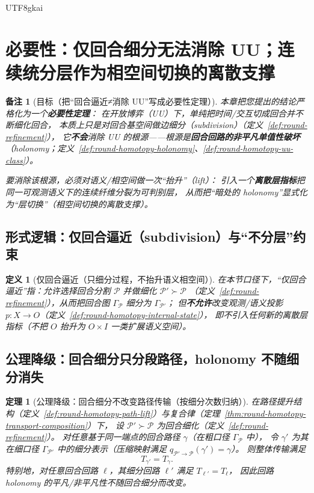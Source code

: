 \documentclass[12pt]{article}
\newtheorem{definition}{定义}[section]
\newtheorem{theorem}{定理}[section]
\newtheorem{remark}{备注}[section]
\begin{document}
\begin{CJK*}{UTF8}{gkai}
\section{必要性：仅回合细分无法消除 UU；连续统分层作为相空间切换的离散支撑}
\label{sec:uu-holonomy-layering-necessity}

\begin{remark}[目标（把“回合逼近≠消除 UU”写成必要性定理）]
本章把您提出的结论严格化为一个\textbf{必要性定理}：
在开放博弈（UU）下，单纯把时间/交互切成回合并不断细化回合，
本质上只是对回合基空间做边细分（subdivision）（定义~\ref{def:round-refinement}），
它\textbf{不会}消除 UU 的根源——根源是\textbf{回合回路的非平凡单值性破坏}（holonomy；定义~\ref{def:round-homotopy-holonomy}、\ref{def:round-homotopy-uu-class}）。

要消除该根源，必须对语义/相空间做一次“抬升”（lift）：
引入一个\textbf{离散层指标}把同一可观测语义下的连续纤维分裂为可判别层，
从而把“暗处的 holonomy”显式化为“层切换”（相空间切换的离散支撑）。
\end{remark}

\subsection{形式逻辑：仅回合逼近（subdivision）与“不分层”约束}
\label{sec:only-round-subdivision-no-layering}

\begin{definition}[仅回合逼近（只细分过程，不抬升语义相空间）]
\label{def:only-round-approximation}
在本节口径下，“仅回合逼近”指：允许选择回合分割 $\mathcal{P}$ 并做细化 $\mathcal{P}'\succ\mathcal{P}$
（定义~\ref{def:round-refinement}），从而把回合图 $\Gamma_{\mathcal{P}}$ 细分为 $\Gamma_{\mathcal{P}'}$；
但\textbf{不允许}改变观测/语义投影 $p:X\to O$（定义~\ref{def:round-homotopy-internal-state}），
即不引入任何新的离散层指标（不把 $O$ 抬升为 $O\times I$ 一类扩展语义空间）。
\end{definition}

\subsection{公理降级：回合细分只分段路径，holonomy 不随细分消失}
\label{sec:subdivision-preserve-holonomy}

\begin{theorem}[公理降级：回合细分不改变路径传输（按细分次数归纳）]
\label{thm:subdivision-preserve-transport}
在路径提升结构（定义~\ref{def:round-homotopy-path-lift}）与复合律（定理~\ref{thm:round-homotopy-transport-composition}）下，
设 $\mathcal{P}'\succ\mathcal{P}$ 为回合细化（定义~\ref{def:round-refinement}）。
对任意基于同一端点的回合路径 $\gamma$（在粗口径 $\Gamma_{\mathcal{P}}$ 中），
令 $\gamma'$ 为其在细口径 $\Gamma_{\mathcal{P}'}$ 中的细分表示（压缩映射满足 $q_{\mathcal{P}'\to\mathcal{P}}(\gamma')=\gamma$）。
则整体传输满足
\[
  T_{\gamma'}=T_{\gamma}.
\]
特别地，对任意回合回路 $\ell$，其细分回路 $\ell'$ 满足 $T_{\ell'}=T_{\ell}$，
因此回路 holonomy 的平凡/非平凡性不随回合细分而改变。
\end{theorem}


\end{CJK*}
\end{document}
